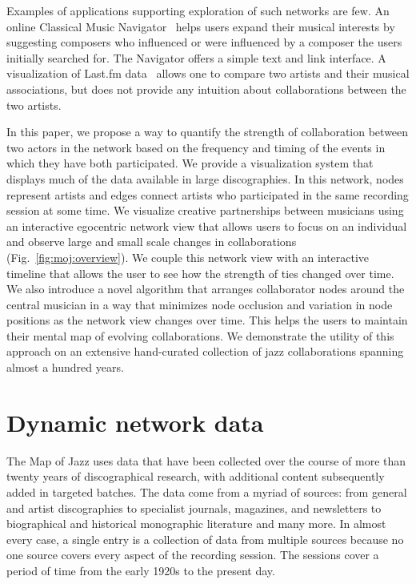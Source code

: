 \documentclass[12pt]{cmuthesis}
\begin{document}
  Examples of applications supporting exploration of such networks are few. An online Classical Music Navigator~\cite{Smith1999} helps users expand their musical interests by suggesting composers who influenced or were influenced by a composer the users initially searched for. The Navigator offers a simple text and link interface. A visualization of Last.fm data~\cite{Bieh-Zimmert2011} allows one to compare two artists and their musical associations, but does not provide any intuition about collaborations between the two artists.

  In this paper, we propose a way to quantify the strength of collaboration between two actors in the network based on the frequency and timing of the events in which they have both participated. We provide a visualization system that displays much of the data available in large discographies. In this network, nodes represent artists and edges connect artists who participated in the same recording session at some time. We visualize creative partnerships between musicians using an interactive egocentric network view that allows users to focus on an individual and observe large and small scale changes in collaborations (Fig.~\ref{fig:moj:overview}). We couple this network view with an interactive timeline that allows the user to see how the strength of ties changed over time. We also introduce a novel algorithm that arranges collaborator nodes around the central musician in a way that minimizes node occlusion and variation in node positions as the network view changes over time. This helps the users to maintain their mental map of evolving collaborations. We demonstrate the utility of this approach on an extensive hand-curated collection of jazz collaborations spanning almost a hundred years.

\section{Dynamic network data}


  The Map of Jazz uses data that have been collected over the course of more than twenty years of discographical research, with additional content subsequently added in targeted batches. The data come from a myriad of sources: from general and artist discographies to specialist journals, magazines, and newsletters to biographical and historical monographic literature and many more. In almost every case, a single entry is a collection of data from multiple sources because no one source covers every aspect of the recording session. The sessions cover a period of time from the early 1920s to the present day.
\end{document}
